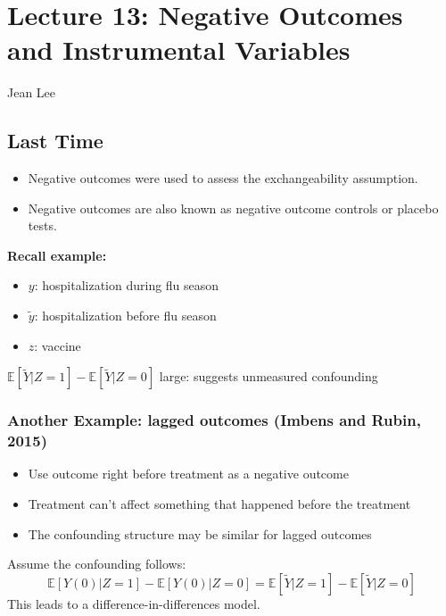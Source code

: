 \section{Lecture 13: Negative Outcomes and Instrumental Variables}{Jean Lee}

\subsection{Last Time}

\begin{itemize}
    \item Negative outcomes were used to assess the exchangeability assumption.
    \item Negative outcomes are also known as negative outcome controls or placebo tests. 
    \end{itemize}
    
\textbf{Recall example:}
\begin{itemize}
    \item \( y \): hospitalization during flu season 
    \item \( \tilde{y} \): hospitalization before flu season
    \item \( z \): vaccine
    
\end{itemize}
$\mathbb{E}[\tilde{Y}|Z=1] - \mathbb{E}[\tilde{Y}|Z=0]$ large: suggests unmeasured confounding


\subsubsection{Another Example: lagged outcomes (Imbens and Rubin, 2015)}
\begin{itemize}
    \item Use outcome right before treatment as a negative outcome
    \item Treatment can't affect something that happened before the treatment
    \item The confounding structure may be similar for lagged outcomes
\end{itemize}
Assume the confounding follows:
\[
\mathbb{E}[Y(0) | Z = 1] - \mathbb{E}[Y(0) | Z = 0] = \mathbb{E}[\tilde{Y} | Z = 1] - \mathbb{E}[\tilde{Y}| Z = 0]
\]
This leads to a difference-in-differences model.

